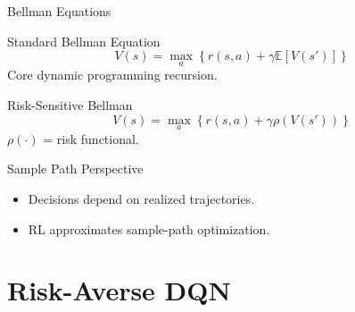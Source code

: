 \documentclass[aspectratio=169, 10pt]{beamer}
\begin{document}
\begin{frame}{Bellman Equations}
  \begin{block}{Standard Bellman Equation}
    $$V(s) = \max_a \left\{ r(s,a) + \gamma \mathbb{E}[V(s')] \right\}$$
    Core dynamic programming recursion.
  \end{block}

  \begin{block}{Risk-Sensitive Bellman}
    $$V(s) = \max_a \left\{ r(s,a) + \gamma \rho(V(s')) \right\}$$
    $\rho(\cdot)$ = risk functional.
  \end{block}

  \begin{block}{Sample Path Perspective}
    \begin{itemize}
      \item Decisions depend on realized trajectories.
      \item RL approximates sample-path optimization.
    \end{itemize}
  \end{block}
\end{frame}

\section{Risk-Averse DQN}
\end{document}
